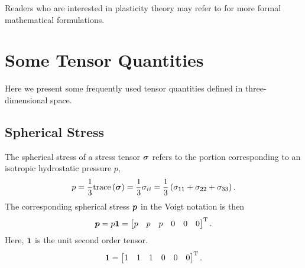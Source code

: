 Readers who are interested in plasticity theory may refer to \cite{Simo1998} for more formal mathematical formulations.
\section{Some Tensor Quantities}
Here we present some frequently used tensor quantities defined in three-dimensional space.
\subsection{Spherical Stress}
The spherical stress of a stress tensor $\bm{\sigma}$ refers to the portion corresponding to an isotropic hydrostatic pressure $p$,
\begin{gather}
p=\dfrac{1}{3}\text{trace}\left(\bm{\sigma}\right)=\dfrac{1}{3}\sigma_{ii}=\dfrac{1}{3}\left(\sigma_{11}+\sigma_{22}+\sigma_{33}\right).
\end{gather}
The corresponding spherical stress $\bm{p}$ in the Voigt notation is then
\begin{gather}
\bm{p}=p\bm{1}=\begin{bmatrix}p&p&p&0&0&0\end{bmatrix}^{\mathrm{T}}.
\end{gather}
Here, $\bm{1}$ is the unit second order tensor.
\begin{gather}
\bm{1}=\begin{bmatrix}1&1&1&0&0&0\end{bmatrix}^{\mathrm{T}}.
\end{gather}
